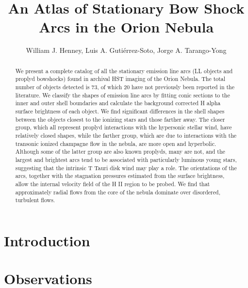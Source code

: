 \documentclass[iop, apj]{emulateapj}
\begin{document}
\title{
  An Atlas of Stationary Bow Shock Arcs in the Orion Nebula
}
\author{
  William J. Henney, 
  Luis A. Gutiérrez-Soto,
  Jorge A. Tarango-Yong 
}


\begin{abstract}
  We present a complete catalog of all the stationary emission line arcs (LL objects and proplyd bowshocks) found in archival HST imaging of the Orion Nebula.   The total number of objects detected is 73, of which 20 have not previously been reported in the literature.  We classify the shapes of emission line arcs by fitting conic sections to the inner and outer shell boundaries and calculate the background corrected H alpha surface brightness of each object.   We find significant differences in the shell shapes between the objects closest to the ionizing stars and those farther away.  The closer group, which all represent proplyd interactions with the hypersonic stellar wind, have relatively closed shapes, while the farther group, which are due to interactions with the transonic ionized champagne flow in the nebula, are more open and hyperbolic.  Although some of the latter group are also known proplyds, many are not, and the largest and brightest arcs tend to be associated with particularly luminous young stars, suggesting that the intrinsic T Tauri disk wind may play a role.  The orientations of the arcs, together with the stagnation pressures estimated from the surface brightness, allow the internal velocity field of the H II region to be probed.  We find that approximately radial flows from the core of the nebula dominate over disordered, turbulent flows.
\end{abstract}

\section{Introduction}
\label{sec:intro}

\section{Observations}
\label{sec:observ}
\end{document}
